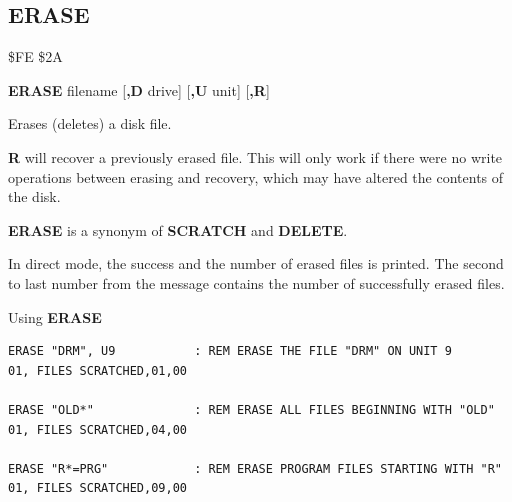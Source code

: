 \subsection{ERASE}
\label{BASIC 65 Commands!ERASE}
\begin{description}[leftmargin=2cm,style=nextline]
\item [Token:]    \$FE \$2A

\item [Format:]   {\bf ERASE} filename [{\bf,D} drive] [{\bf,U} unit] [{\bf,R}]

\item [Usage:]    Erases (deletes) a disk file.

                  \filenamedefinition

                  \drivedefinition

                  \unitdefinition

                  {\bf R} will recover a previously erased file. This will only work if there were no write operations between erasing and recovery, which may have altered the contents of the disk.

\item [Remarks:]  {\bf ERASE} is a synonym of {\bf SCRATCH} and {\bf DELETE}.

                  In direct mode, the success and the number of erased files is printed. The second to last number from the message contains the number of successfully erased files.

\item [Examples:] Using {\bf ERASE}

\begin{tcolorbox}[colback=black,coltext=white]
\verbatimfont{\codefont}
\begin{verbatim}
ERASE "DRM", U9           : REM ERASE THE FILE "DRM" ON UNIT 9
01, FILES SCRATCHED,01,00

ERASE "OLD*"              : REM ERASE ALL FILES BEGINNING WITH "OLD"
01, FILES SCRATCHED,04,00

ERASE "R*=PRG"            : REM ERASE PROGRAM FILES STARTING WITH "R"
01, FILES SCRATCHED,09,00
\end{verbatim}
\end{tcolorbox}
\end{description}


\newpage
